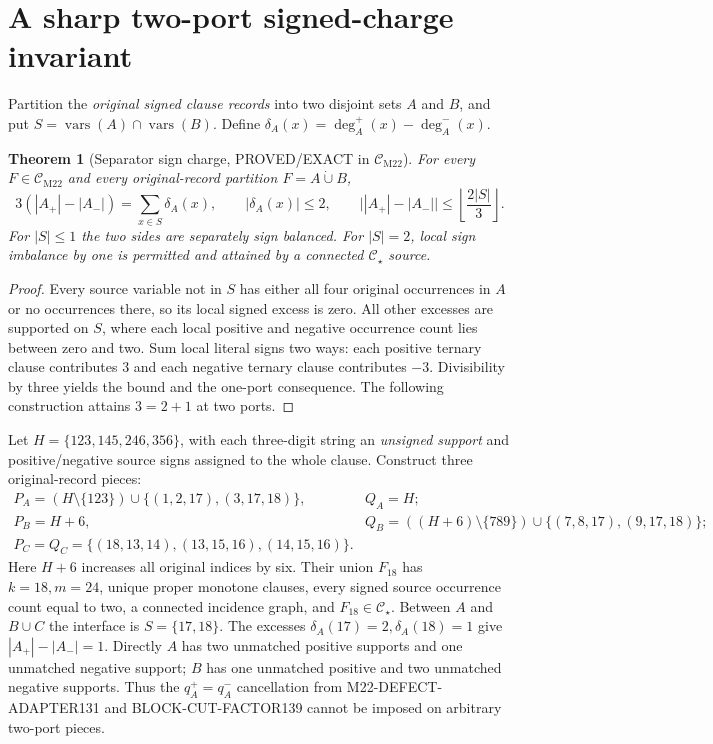 \documentclass[11pt]{article}
\newtheorem{theorem}{Theorem}
\newcommand{\CM}{\mathcal C_{\mathrm{M22}}}
\newcommand{\CS}{\mathcal C_{\star}}
\begin{document}
\section{A sharp two-port signed-charge invariant}
Partition the \emph{original signed clause records} into two disjoint sets \(A\) and \(B\), and put \(S=\operatorname{vars}(A)\cap\operatorname{vars}(B)\). Define \(\delta_A(x)=\deg_A^+(x)-\deg_A^-(x)\).
\begin{theorem}[Separator sign charge, PROVED/EXACT in \(\CM\)]
For every \(F\in\CM\) and every original-record partition \(F=A\dot\cup B\),
\[
 3(|A_+|-|A_-|)=\sum_{x\in S}\delta_A(x),
 \qquad |\delta_A(x)|\le2,
 \qquad \big||A_+|-|A_-|\big|\le\left\lfloor\frac{2|S|}{3}\right\rfloor.
\]
For \(|S|\le1\) the two sides are separately sign balanced. For \(|S|=2\), local sign imbalance by one is permitted and attained by a connected \(\CS\) source.
\end{theorem}
\begin{proof}
Every source variable not in \(S\) has either all four original occurrences in \(A\) or no occurrences there, so its local signed excess is zero. All other excesses are supported on \(S\), where each local positive and negative occurrence count lies between zero and two. Sum local literal signs two ways: each positive ternary clause contributes \(3\) and each negative ternary clause contributes \(-3\). Divisibility by three yields the bound and the one-port consequence. The following construction attains \(3=2+1\) at two ports.
\end{proof}

Let \(H=\{123,145,246,356\}\), with each three-digit string an \emph{unsigned support} and positive/negative source signs assigned to the whole clause. Construct three original-record pieces:
\[
\begin{array}{ll}
P_A=(H\setminus\{123\})\cup\{(1,2,17),(3,17,18)\},& Q_A=H;\\
P_B=H+6,& Q_B=((H+6)\setminus\{789\})\cup\{(7,8,17),(9,17,18)\};\\
P_C=Q_C=\{(18,13,14),(13,15,16),(14,15,16)\}.&
\end{array}
\]
Here \(H+6\) increases all original indices by six. Their union \(F_{18}\) has \(k=18,m=24\), unique proper monotone clauses, every signed source occurrence count equal to two, a connected incidence graph, and \(F_{18}\in\CS\). Between \(A\) and \(B\cup C\) the interface is \(S=\{17,18\}\). The excesses \(\delta_A(17)=2,\delta_A(18)=1\) give \(|A_+|-|A_-|=1\). Directly \(A\) has two unmatched positive supports and one unmatched negative support; \(B\) has one unmatched positive and two unmatched negative supports. Thus the \(q^+_A=q^-_A\) cancellation from M22-DEFECT-ADAPTER131 and BLOCK-CUT-FACTOR139 cannot be imposed on arbitrary two-port pieces.
\end{document}

